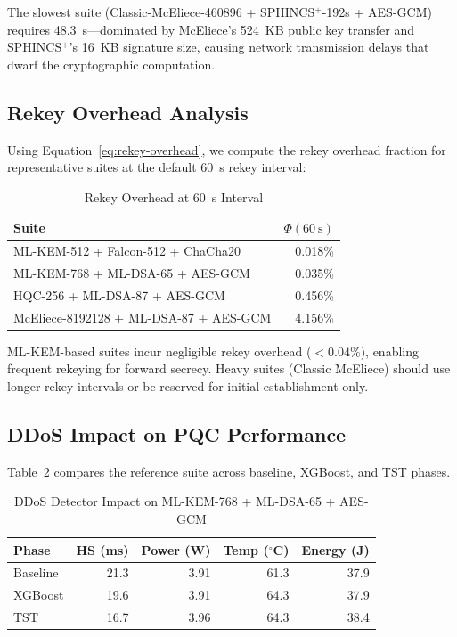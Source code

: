 \documentclass[conference]{IEEEtran}
\begin{document}
The slowest suite (Classic-McEliece-460896 + SPHINCS$^+$-192s + AES-GCM) requires \SI{48.3}{\second}---dominated by McEliece's 524~KB public key transfer and SPHINCS$^+$'s 16~KB signature size, causing network transmission delays that dwarf the cryptographic computation.

\subsection{Rekey Overhead Analysis}

Using Equation~\ref{eq:rekey-overhead}, we compute the rekey overhead fraction for representative suites at the default \SI{60}{\second} rekey interval:

\begin{table}[t]
\centering
\caption{Rekey Overhead at \SI{60}{\second} Interval}
\label{tab:rekey-overhead}
\small
\begin{tabular}{@{}lr@{}}
\toprule
\textbf{Suite} & $\Phi(\SI{60}{\second})$ \\
\midrule
ML-KEM-512 + Falcon-512 + ChaCha20 & 0.018\% \\
ML-KEM-768 + ML-DSA-65 + AES-GCM & 0.035\% \\
HQC-256 + ML-DSA-87 + AES-GCM & 0.456\% \\
McEliece-8192128 + ML-DSA-87 + AES-GCM & 4.156\% \\
\bottomrule
\end{tabular}
\end{table}

ML-KEM-based suites incur negligible rekey overhead ($< 0.04\%$), enabling frequent rekeying for forward secrecy.
Heavy suites (Classic McEliece) should use longer rekey intervals or be reserved for initial establishment only.

\subsection{DDoS Impact on PQC Performance}

Table~\ref{tab:ddos-impact} compares the reference suite across baseline, XGBoost, and TST phases.

\begin{table}[t]
\centering
\caption{DDoS Detector Impact on ML-KEM-768 + ML-DSA-65 + AES-GCM}
\label{tab:ddos-impact}
\small
\begin{tabular}{@{}lrrrr@{}}
\toprule
\textbf{Phase} & \textbf{HS (ms)} & \textbf{Power (W)} & \textbf{Temp ($^\circ$C)} & \textbf{Energy (J)} \\
\midrule
Baseline & 21.3 & 3.91 & 61.3 & 37.9 \\
XGBoost & 19.6 & 3.91 & 64.3 & 37.9 \\
TST & 16.7 & 3.96 & 64.3 & 38.4 \\
\bottomrule
\end{tabular}
\end{table}
\end{document}
